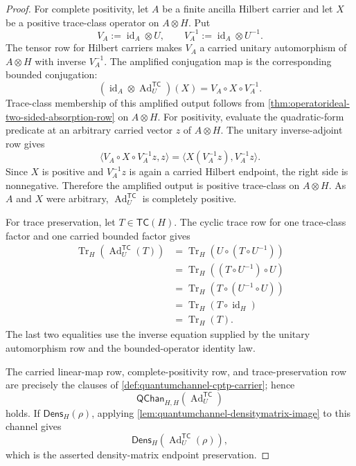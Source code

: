 \begin{proof}
For complete positivity, let $A$ be a finite ancilla Hilbert carrier and let $X$ be a positive trace-class operator on $A\otimes H$. Put
$$
V_A:=\operatorname{id}_A\otimes U,
\qquad
V_A^{-1}:=\operatorname{id}_A\otimes U^{-1}.
$$
The tensor row for Hilbert carriers makes $V_A$ a carried unitary automorphism of $A\otimes H$ with inverse $V_A^{-1}$. The amplified conjugation map is the corresponding bounded conjugation:
$$
(\operatorname{id}_A\otimes\operatorname{Ad}^{\mathsf{TC}}_U)(X)
=
V_A\circ X\circ V_A^{-1}.
$$
Trace-class membership of this amplified output follows from \autoref{thm:operatorideal-two-sided-absorption-row} on $A\otimes H$. For positivity, evaluate the quadratic-form predicate at an arbitrary carried vector $z$ of $A\otimes H$. The unitary inverse-adjoint row gives
$$
\langle V_A\circ X\circ V_A^{-1}z,z\rangle
=
\langle X(V_A^{-1}z),V_A^{-1}z\rangle.
$$
Since $X$ is positive and $V_A^{-1}z$ is again a carried Hilbert endpoint, the right side is nonnegative. Therefore the amplified output is positive trace-class on $A\otimes H$. As $A$ and $X$ were arbitrary, $\operatorname{Ad}^{\mathsf{TC}}_U$ is completely positive.

For trace preservation, let $T\in\mathsf{TC}(H)$. The cyclic trace row for one trace-class factor and one carried bounded factor gives
$$
\begin{aligned}
\operatorname{Tr}_H(\operatorname{Ad}^{\mathsf{TC}}_U(T))
&=\operatorname{Tr}_H(U\circ (T\circ U^{-1}))\\
&=\operatorname{Tr}_H((T\circ U^{-1})\circ U)\\
&=\operatorname{Tr}_H(T\circ (U^{-1}\circ U))\\
&=\operatorname{Tr}_H(T\circ \operatorname{id}_H)\\
&=\operatorname{Tr}_H(T).
\end{aligned}
$$
The last two equalities use the inverse equation supplied by the unitary automorphism row and the bounded-operator identity law.

The carried linear-map row, complete-positivity row, and trace-preservation row are precisely the clauses of \autoref{def:quantumchannel-cptp-carrier}; hence
$$
\mathsf{QChan}_{H,H}(\operatorname{Ad}^{\mathsf{TC}}_U)
$$
holds. If $\mathsf{Dens}_H(\rho)$, applying \autoref{lem:quantumchannel-densitymatrix-image} to this channel gives
$$
\mathsf{Dens}_H(\operatorname{Ad}^{\mathsf{TC}}_U(\rho)),
$$
which is the asserted density-matrix endpoint preservation.
\end{proof}

